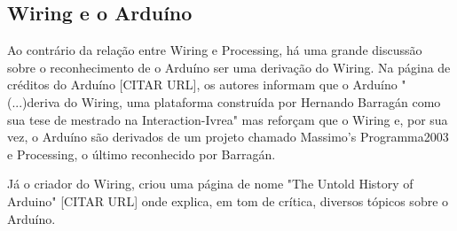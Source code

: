 \subsection{Wiring e o Arduíno}

Ao contrário da relação entre Wiring e Processing, há uma grande discussão sobre o reconhecimento de o Arduíno ser uma derivação do Wiring.
Na página de créditos do Arduíno [CITAR URL], os autores informam que o Arduíno "(...)deriva do Wiring, uma plataforma construída por Hernando Barragán como sua tese de mestrado na Interaction-Ivrea" mas reforçam que o Wiring e, por sua vez, o Arduíno são derivados de um projeto chamado Massimo's Programma2003 e Processing, o último reconhecido por Barragán. 

Já o criador do Wiring, criou uma página de nome "The Untold History of Arduino" [CITAR URL] onde explica, em tom de crítica, diversos tópicos sobre o Arduíno.

